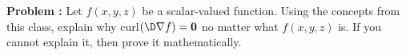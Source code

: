 {\bf Problem :}  Let $f(x,y,z)$ be a scalar-valued function.  Using the concepts from this class, explain why curl$(\D \nabla f) = {\bf 0}$ no matter what $f(x,y,z)$ is.  If you cannot explain it, then prove it mathematically.
